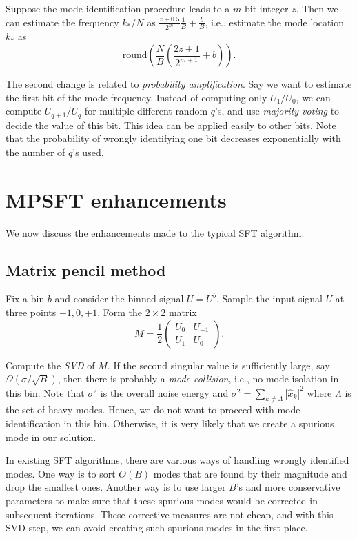\documentclass[10pt]{article}
\begin{document}
Suppose the mode identification procedure leads to a $m$-bit integer $z$. Then we can estimate the frequency $k_*/N$ as $\frac{z+0.5}{2^m} \frac{1}{B} + \frac{b}{B}$, i.e., estimate the mode location $k_*$ as
$$\text{round}\left( \frac{N}{B} \left( \frac{2z+1}{2^{m+1}} + b\right)\right).$$

The second change is related to \emph{probability amplification}. Say we want to estimate the first bit of the mode frequency. Instead of computing only $U_{1}/U_0$, we can compute $U_{q+1}/U_q$ for multiple different random $q$'s, and use \emph{majority voting} to decide the value of this bit. This idea can be applied easily to other bits. Note that the probability of wrongly identifying one bit decreases exponentially with the number of $q$'s used.

\section{MPSFT enhancements}

We now discuss the enhancements made to the typical SFT algorithm.

\subsection{Matrix pencil method}
Fix a bin $b$ and consider the binned signal $U=U^b$. Sample the input signal $U$ at three points $-1, 0, +1$. Form the $2\times 2$ matrix
$$M = \frac{1}{2} \left( \begin{array}{cc}
U_0 & U_{-1} \\
U_{1} & U_0
\end{array} \right).$$

Compute the \emph{SVD} of $M$. If the second singular value is sufficiently large, say $\Omega(\sigma/\sqrt{B})$, then there is probably a \emph{mode collision}, i.e., no mode isolation in this bin. Note that $\sigma^2$ is the overall noise energy and $\sigma^2= \sum_{k\neq \Lambda} |\hat{x}_k|^2$ where $\Lambda$ is the set of heavy modes. Hence, we do not want to proceed with mode identification in this bin. Otherwise, it is very likely that we create a spurious mode in our solution.

In existing SFT algorithms, there are various ways of handling wrongly identified modes. One way is to sort $O(B)$ modes that are found by their magnitude and drop the smallest ones. Another way is to use larger $B$'s and more conservative parameters to make sure that these spurious modes would be corrected in subsequent iterations. These corrective measures are not cheap, and with this SVD step, we can avoid creating such spurious modes in the first place.
\end{document}
